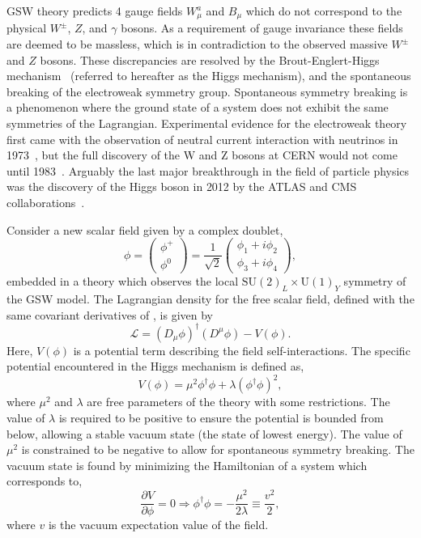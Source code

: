 \Gls{GSW} theory predicts 4 gauge fields $W^a_\mu$ and $B_\mu$ which do not correspond to the physical $W^\pm$, $Z$, and $\gamma$ bosons.
As a requirement of gauge invariance these fields are deemed to be massless, which is in contradiction to the observed massive $W^\pm$ and $Z$ bosons.
These discrepancies are resolved by the Brout-Englert-Higgs mechanism~\cite{Higgs1, Higgs2, Higgs3} (referred to hereafter as the Higgs mechanism), and the spontaneous breaking of the electroweak symmetry group.
Spontaneous symmetry breaking is a phenomenon where the ground state of a system does not exhibit the same symmetries of the Lagrangian.
Experimental evidence for the electroweak theory first came with the
observation of neutral current interaction with neutrinos in 1973\@~\cite{ObservationNeutrinolikeInteractions}, but the full discovery of the W and Z bosons at CERN would not come until 1983\@~\cite{WZ}.
Arguably the last major breakthrough in the field of particle physics was the discovery of the Higgs boson in 2012 by the \Gls{ATLAS} and \Gls{CMS} collaborations~\cite{ATLASHiggs, CMSHiggs}.

Consider a new scalar field given by a complex doublet,
\begin{equation}
    \phi = \begin{pmatrix} \phi^+ \\ \phi^0 \end{pmatrix} = \frac{1}{\sqrt{2}} \begin{pmatrix} \phi_1 + i \phi_2 \\ \phi_3 + i \phi_4 \end{pmatrix},
\end{equation}
embedded in a theory which observes the local $\text{SU}(2)_L \times \text{U}(1)_Y$ symmetry of the \Gls{GSW} model.
The Lagrangian density for the free scalar field, defined with the same covariant derivatives of , is given by
\begin{equation}
    \label{eq:higgs_lagrangian}
    \mathcal{L} = (D_\mu \phi)^\dagger (D^\mu \phi) - V(\phi).
\end{equation}
Here, $V(\phi)$ is a potential term describing the field self-interactions.
The specific potential encountered in the Higgs mechanism is defined as,
\begin{equation}
    \label{eq:higgs_potential}
    V(\phi) = \mu^2 \phi^\dagger \phi + \lambda (\phi^\dagger \phi)^2,
\end{equation}
where $\mu^2$ and $\lambda$ are free parameters of the theory with some restrictions.
The value of $\lambda$ is required to be positive to ensure the potential is bounded from below, allowing a stable vacuum state (the state of lowest energy).
The value of $\mu^2$ is constrained to be negative to allow for spontaneous symmetry breaking.
The vacuum state is found by minimizing the Hamiltonian of a system which corresponds to,
\begin{equation}
    \frac{\partial V}{\partial \phi} = 0 \Longrightarrow  \phi^\dagger \phi = -\frac{\mu^2}{2\lambda} \equiv \frac{v^2}{2},
\end{equation}
where $v$ is the vacuum expectation value of the field.

